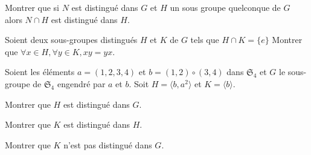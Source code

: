\documentclass{report}
\begin{document}
\begin{exo}
    Montrer que si \(N\) est distingué dans \(G\) et \(H\) un sous groupe quelconque de
    \(G\) alors \(N\cap H\) est distingué dans \(H\).
\end{exo}

\begin{exo}
    Soient deux sous-groupes distingués \(H\) et \(K\) de \(G\) tels que \(H\cap K=\{e\}\)
    Montrer que \(\forall x\in H,\forall y\in K, xy=yx\).
\end{exo}

\begin{exo}
    Soient les éléments \(a = (1,2,3,4)\) et \(b = (1,2) \circ (3,4)\) dans \(\mathfrak{S}_4\)
    et \(G\) le sous-groupe de \(\mathfrak{S}_4\) engendré par \(a\) et \(b\). Soit
    \(H = \langle b, a^2 \rangle\) et \(K = \langle b \rangle\).
    \begin{q}{1}
        Montrer que \(H\) est distingué dans \(G\).
    \end{q}
    \begin{q}{2}
        Montrer que \(K\) est distingué dans \(H\).
    \end{q}
    \begin{q}{3}
        Montrer que \(K\) n'est pas distingué dans \(G\).
    \end{q}
\end{exo}
\end{document}

